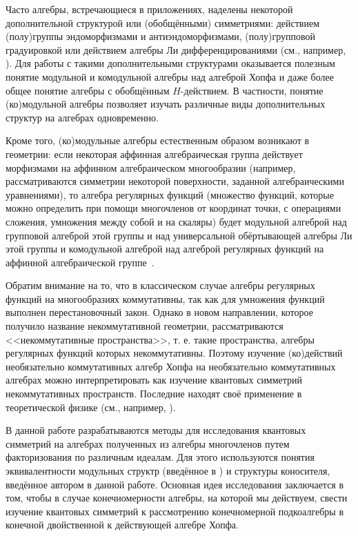 \documentclass[12pt, reqno, a4paper, oneside, notitlepage]{amsart}
\theoremstyle{mytheoremstyle}
\theoremstyle{myremarkstyle}
\numberwithin{equation}{section}
\begin{document}
Часто алгебры, встречающиеся в приложениях, наделены некоторой дополнительной структурой или (обобщёнными) симметриями: действием (полу)группы эндоморфизмами и антиэндоморфизмами, (полу)групповой градуировкой или действием алгебры Ли дифференцированиями (см., например, \cite{PolyakovBook, HaagBook, KakuBook, MajidBook}). Для работы с такими дополнительными структурами оказывается полезным понятие модульной и комодульной алгебры над алгеброй Хопфа и даже более общее понятие алгебры с обобщённым $H$-действием. В частности, понятие (ко)модульной алгебры позволяет изучать различные виды дополнительных структур на алгебрах одновременно.

Кроме того, (ко)модульные алгебры естественным образом возникают в геометрии: если некоторая аффинная алгебраическая группа действует морфизмами на аффинном алгебраическом многообразии (например, рассматриваются симметрии некоторой поверхности, заданной алгебраическими уравнениями), то алгебра регулярных функций (множество функций, которые можно определить при помощи многочленов от координат точки,
с операциями сложения, умножения между собой и на скаляры) будет модульной алгеброй над групповой алгеброй этой группы и над универсальной обёртывающей алгебры Ли этой группы и комодульной алгеброй над алгеброй регулярных функций на аффинной алгебраической группе~\cite{Abe}.

Обратим внимание на то, что в классическом случае алгебры регулярных функций на многообразиях коммутативны, так как для умножения функций выполнен перестановочный закон. Однако в новом направлении, которое получило название некоммутативной геометрии, рассматриваются <<некоммутативные пространства>>, т. е. такие пространства, алгебры регулярных функций которых некоммутативны. Поэтому изучение (ко)действий необязательно коммутативных алгебр Хопфа на необязательно коммутативных алгебрах можно интерпретировать как изучение квантовых симметрий некоммутативных пространств. Последние находят своё применение в теоретической физике (см., например, \cite{ConnesMarcolli, Donatsos}).

В данной работе разрабатываются методы для исследования квантовых симметрий на алгебрах полученных из алгебры многочленов путем факторизования по различным идеалам. Для этого используются понятия эквивалентности модульных структр (введённое в \cite{ASGordienko21ALAgoreJVercruysse}) и структуры коносителя, введённое автором в данной работе. Основная идея исследования заключается в том, чтобы в случае конечномерности алгебры, на которой мы действуем, свести изучение квантовых симметрий к рассмотрению конечномерной подкоалгебры в конечной двойственной к действующей алгебре Хопфа.
\end{document}
